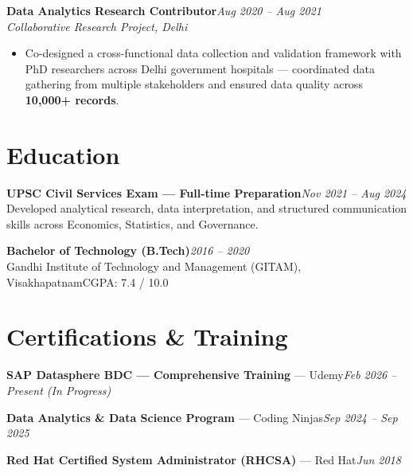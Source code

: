 \documentclass[10pt, letterpaper]{article}
\newcommand{\role}[3]{%
  \vspace{2pt}%
  {\bfseries #1}\hfill{\small\color{muted}\textit{#3}}\\[-2pt]%
  {\small\color{muted}\textit{#2}}%
}
\begin{document}
\role{Data Analytics Research Contributor}{Collaborative Research Project, Delhi}{Aug 2020 – Aug 2021}

\begin{itemize}
  \item Co-designed a cross-functional data collection and validation framework with PhD researchers across Delhi government hospitals — coordinated data gathering from multiple stakeholders and ensured data quality across \textbf{10,000+ records}.
\end{itemize}

\section{Education}

{\bfseries UPSC Civil Services Exam — Full-time Preparation}\hfill{\small\color{muted}\textit{Nov 2021 – Aug 2024}}\\
{\small\color{muted}Developed analytical research, data interpretation, and structured communication skills across Economics, Statistics, and Governance.}

\vspace{2pt}
{\bfseries Bachelor of Technology (B.Tech)}\hfill{\small\color{muted}\textit{2016 – 2020}}\\
{\small\color{muted}Gandhi Institute of Technology and Management (GITAM), Visakhapatnam\hfill CGPA: 7.4 / 10.0}

\section{Certifications \& Training}

{\bfseries SAP Datasphere BDC — Comprehensive Training} — Udemy\hfill{\small\color{muted}\textit{Feb 2026 – Present \emph{(In Progress)}}}

\vspace{1pt}
{\bfseries Data Analytics \& Data Science Program} — Coding Ninjas\hfill{\small\color{muted}\textit{Sep 2024 – Sep 2025}}

\vspace{1pt}
{\bfseries Red Hat Certified System Administrator (RHCSA)} — Red Hat\hfill{\small\color{muted}\textit{Jun 2018}}

\end{document}
